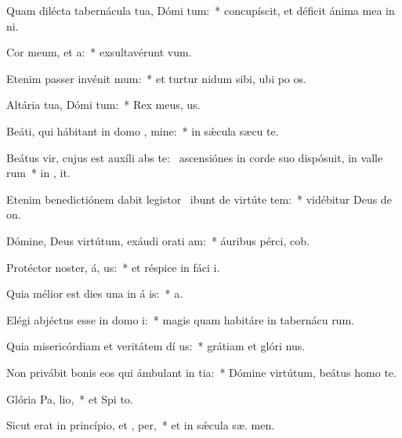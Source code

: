 \item Quam dilécta tabernácula tua, Dómi tum:~* concupíscit, et déficit ánima mea in  ni.
\item Cor meum, et  a:~* exsultavérunt   vum.
\item Etenim passer invénit  mum:~* et turtur nidum sibi, ubi po  os.
\item Altária tua, Dómi tum:~* Rex meus,   us.
\item Beáti, qui hábitant in domo , mine:~* in sǽcula sæcu  te.
\item Beátus vir, cujus est auxíli abs te:~\pscross{} ascensiónes in corde suo dispósuit, in valle rum~* in ,  it.
\item Etenim benedictiónem dabit legistor~\pscross{} ibunt de virtúte  tem:~* vidébitur Deus de  on.
\item Dómine, Deus virtútum, exáudi orati am:~* áuribus pérci,  cob.
\item Protéctor noster, á, us:~* et réspice in fáci  i.
\item Quia mélior est dies una in á is:~*  a.
\item Elégi abjéctus esse in domo  i:~* magis quam habitáre in tabernácu rum.
\item Quia misericórdiam et veritátem dí us:~* grátiam et glóri  nus.
\item Non privábit bonis eos qui ámbulant in tia:~* Dómine virtútum, beátus homo    te.
\item Glória Pa,  lio,~* et Spi to.
\item Sicut erat in princípio, et ,  per,~* et in sǽcula sæ. men.
